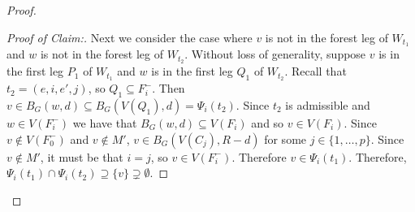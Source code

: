 \documentclass{patmorin}
\newenvironment{clmproof}{\begin{proof}[Proof of Claim:]\renewcommand{\qedsymbol}{\rule{1ex}{1ex}}}{\end{proof}}
\begin{document}
\begin{proof}
\begin{clmproof}
  Next we consider the case where $v$ is not in the forest leg of $W_{t_1}$ and $w$ is not in the forest leg of $W_{t_2}$.  Without loss of generality, suppose $v$ is in the first leg $P_1$ of $W_{t_1}$ and $w$ is in the first leg $Q_1$ of $W_{t_2}$. 
  Recall that $t_2=(e,i,e',j)$, so $Q_1\subseteq F_i^-$. 
  Then $v\in B_G(w,d)\subseteq B_G(V(Q_1),d) = \Psi_i(t_2)$.  
  Since $t_2$ is admissible and $w\in V(F^-_i)$ we have that $B_G(w,d) \subseteq V(F_i)$ and so $v\in V(F_i)$. 
  Since $v\not\in V(F_0^-)$ and $v\not\in M'$, 
  $v\in B_G(V(C_j),R-d)$ for some $j\in\{1,\ldots,p\}$.  Since $v\notin M'$, it must be that $i=j$, so $v\in V(F^-_i)$.  Therefore $v\in\Psi_i(t_1)$.
  Therefore, $\Psi_i(t_1)\cap\Psi_i(t_2)\supseteq\{v\}\supsetneq \emptyset$. \qedhere

\end{clmproof}
\end{proof}
\end{document}
